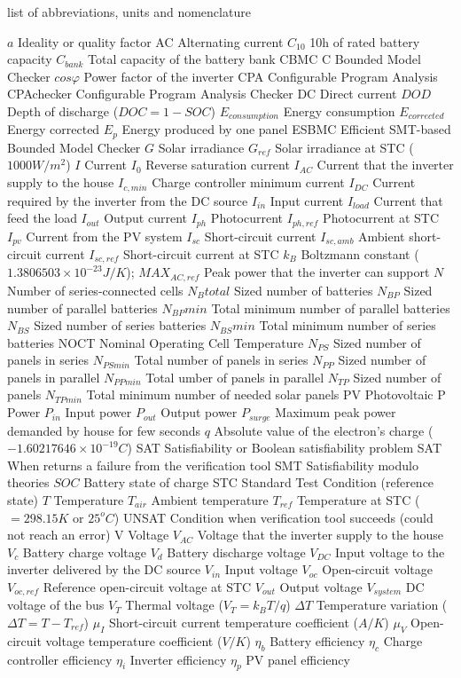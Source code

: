 list of abbreviations, units and nomenclature

$a$ Ideality or quality factor
AC Alternating current
$C_{10}$ 10h of rated battery capacity
$C_{bank}$ Total capacity of the battery bank
CBMC C Bounded Model Checker
$ cos \varphi $ Power factor of the inverter
CPA Configurable Program Analysis
CPAchecker Configurable Program Analysis Checker
DC Direct current
$DOD$ Depth of discharge ($DOC=1-SOC$)
$E_{consumption}$ Energy consumption
$E_{corrected}$ Energy corrected
$E_{p}$ Energy produced by one panel
ESBMC Efficient SMT-based Bounded Model Checker
$G$ Solar irradiance
$ G_{ref} $ Solar irradiance at STC ($1000 W/m^{2}$)
$I$ Current
$I_{0}$ Reverse saturation current
$ I_{AC} $ Current that the inverter supply to the house
$I_{c,min}$ Charge controller minimum current
$ I_{DC} $ Current required by the inverter from the DC source 
$ I_{in} $ Input current
$I_{load}$ Current that feed the load
$ I_{out} $ Output current
$I_{ph}$ Photocurrent
$ I_{ph,ref} $ Photocurrent at STC
$I_{pv}$ Current from the PV system
$ I_{sc} $ Short-circuit current
$ I_{sc,amb} $ Ambient short-circuit current
$ I_{sc,ref} $ Short-circuit current at STC
$ k_{B} $ Boltzmann constant ($ 1.3806503\times10^{-23}J/K $); 
$MAX_{AC,ref}$ Peak power that the inverter can support
$N$ Number of series-connected cells
$N_{B}total$ Sized number of batteries
$N_{BP}$ Sized number of parallel batteries
$N_{BP}min$ Total minimum number of parallel batteries
$N_{BS}$ Sized number of series batteries
$N_{BS}min$ Total minimum number of series batteries
NOCT Nominal Operating Cell Temperature
$N_{PS}$ Sized number of panels in series
$N_{PSmin}$ Total number of panels in series
$N_{PP}$ Sized number of panels in parallel
$N_{PPmin}$ Total umber of panels in parallel
$ N_{TP} $ Sized number of panels
$N_{TPmin}$ Total minimum number of needed solar panels
PV Photovoltaic
P Power
$P_{in}$ Input power
$P_{out}$ Output power
$P_{surge}$ Maximum peak power demanded by house for few seconds
$q$ Absolute value of the electron's charge ($ -1.60217646\times10^{-19}C $)
SAT Satisfiability or Boolean satisfiability problem 
SAT When returns a failure from the verification tool
SMT Satisfiability modulo theories
$ SOC $ Battery state of charge
STC Standard Test Condition (reference state)
$T$ Temperature
$ T_{air} $ Ambient temperature
$ T_{ref}$ Temperature at STC ($=298.15 K$ or $25^{o}C$)
UNSAT Condition when verification tool succeeds (could not reach an error)
V Voltage
$ V_{AC}  $ Voltage that the inverter supply to the house
$V_{c}$ Battery charge voltage 
$V_{d}$ Battery discharge voltage
$ V_{DC} $ Input voltage to the inverter delivered by the DC source
$ V_{in} $ Input voltage
$ V_{oc} $ Open-circuit voltage
$ V_{oc,ref} $ Reference open-circuit voltage at STC
$ V_{out} $ Output voltage
$ V_{system} $ DC voltage of the bus
$V_{T}$ Thermal voltage ($ V_{T}=k_{B}T/q $)
$\Delta T$ Temperature variation ($\Delta T=T-T_{ref} $)
$ \mu_{I} $ Short-circuit current temperature coefficient ($A/K$)
$ \mu_{V} $ Open-circuit voltage temperature coefficient ($ V/K $)
$\eta_{b}$ Battery efficiency
$\eta_{c}$ Charge controller efficiency
$\eta_{i}$ Inverter efficiency
$\eta_{p}$ PV panel efficiency


